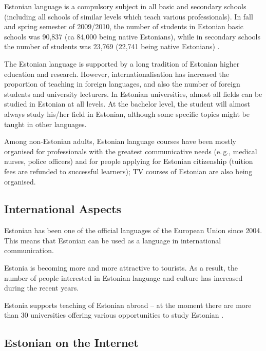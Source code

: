 \begin{multicols}{2}
Estonian language is a compulsory subject in all basic and secondary schools (including all schools of similar levels which teach various professionals). 
In fall and spring semester of 2009/2010, the number of students in Estonian basic schools was 90,837 (ca 84,000 being native Estonians), while in secondary schools the number of students was 23,769 (22,741 being native Estonians) \cite{DevPlan}.


The Estonian language is supported by a long tradition of Estonian higher education and research. 
However, internationalisation has increased the proportion of teaching in foreign languages, and also the number of foreign students and university lecturers. 
In Estonian universities, almost all ﬁelds can be studied in Estonian at all levels. 
At the bachelor level, the student will almost always study his/her ﬁeld in Estonian, although some speciﬁc topics might be taught in other languages.

Among non-Estonian adults, Estonian language courses have been mostly organised for professionals with the greatest communicative needs (e.\,g., medical nurses, police officers) and for people applying for Estonian citizenship (tuition fees are refunded to successful learners); TV courses of Estonian are also being organised.
 

\subsection{International Aspects}

Estonian has been one of the official languages of the European Union since 2004. 
This means that Estonian can be used as a language in international communication.
 
Estonia is becoming more and more attractive to tourists. 
As a result, the number of people interested in Estonian language and culture has increased during the recent years.

Estonia supports teaching of Estonian abroad -- at the moment there are more than 30 universities offering various opportunities to study Estonian \cite{EstInst}.
 
\subsection{Estonian on the Internet}


\end{multicols}
